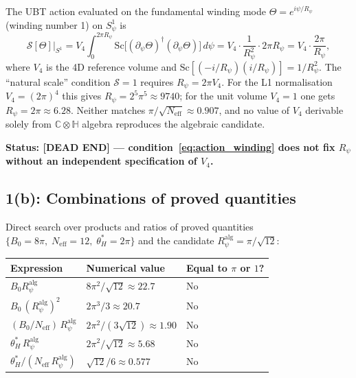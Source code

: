 \documentclass[11pt,a4paper]{article}
\theoremstyle{definition}
\theoremstyle{remark}
\begin{document}
The UBT action evaluated on the fundamental winding mode
$\Theta = e^{i\psi/R_\psi}$ (winding number 1) on $S^1_\psi$ is
\begin{equation}
  \mathcal{S}[\Theta]\big|_{S^1}
  = V_4 \int_0^{2\pi R_\psi}
    \mathrm{Sc}\!\bigl[(\partial_\psi\Theta)^\dagger(\partial_\psi\Theta)\bigr]
    \,d\psi
  = V_4\cdot\frac{1}{R_\psi^2}\cdot 2\pi R_\psi
  = V_4\cdot\frac{2\pi}{R_\psi},
  \label{eq:action_winding}
\end{equation}
where $V_4$ is the 4D reference volume and
$\mathrm{Sc}[(-i/R_\psi)(i/R_\psi)] = 1/R_\psi^2$.
The ``natural scale'' condition $\mathcal{S} = 1$ requires
$R_\psi = 2\pi V_4$.
For the L1 normalisation $V_4 = (2\pi)^4$ this gives
$R_\psi = 2^5\pi^5 \approx 9740$;
for the unit volume $V_4 = 1$ one gets $R_\psi = 2\pi \approx 6.28$.
Neither matches $\pi/\sqrt{N_{\mathrm{eff}}} \approx 0.907$,
and no value of $V_4$ derivable solely from $\mathbb{C}\otimes\mathbb{H}$
algebra reproduces the algebraic candidate.

\medskip
\textbf{Status: \textbf{[DEAD END]} --- condition~\eqref{eq:action_winding}
does not fix $R_\psi$ without an independent specification of $V_4$.}

\subsection{1(b): Combinations of proved quantities}

Direct search over products and ratios of proved quantities
$\{B_0 = 8\pi,\; N_{\mathrm{eff}} = 12,\; \theta_H^* = 2\pi\}$
and the candidate $R_\psi^{\mathrm{alg}} = \pi/\sqrt{12}$:

\begin{center}
\begin{tabular}{lll}
  \toprule
  Expression & Numerical value & Equal to $\pi$ or $1$? \\
  \midrule
  $B_0 R_\psi^{\mathrm{alg}}$
    & $8\pi^2/\sqrt{12} \approx 22.7$ & No \\
  $B_0\,(R_\psi^{\mathrm{alg}})^2$
    & $2\pi^3/3 \approx 20.7$ & No \\
  $(B_0/N_{\mathrm{eff}})\,R_\psi^{\mathrm{alg}}$
    & $2\pi^2/(3\sqrt{12}) \approx 1.90$ & No \\
  $\theta_H^*\, R_\psi^{\mathrm{alg}}$
    & $2\pi^2/\sqrt{12} \approx 5.68$ & No \\
  $\theta_H^*/(N_{\mathrm{eff}}\,R_\psi^{\mathrm{alg}})$
    & $\sqrt{12}/6 \approx 0.577$ & No \\
  \bottomrule
\end{tabular}
\end{center}
\end{document}
